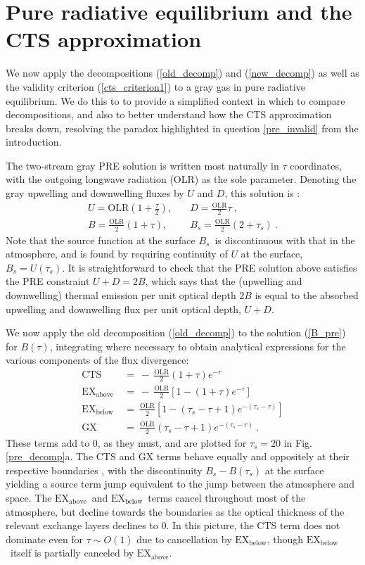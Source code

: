 \documentclass{ametsoc}
\newcommand{\beqn}{\begin{equation}}
\newcommand{\eeqn}{\end{equation}}
\newcommand{\n}{\nonumber}
\newcommand{\eqnref}[1]{(\ref{#1})}
\newcommand{\OLR}{\ensuremath{\mathrm{OLR}}}
\newcommand{\taus}{\ensuremath{\tau_s}}
\newcommand{\Bs}{\ensuremath{B_s}}
\newcommand{\GX}{\ensuremath{\mathrm{GX}}}
\newcommand{\CTS}{\ensuremath{\mathrm{CTS}}}
\newcommand{\EXbelow}{\ensuremath{\mathrm{EX_{below}}}}
\newcommand{\EXabove}{\ensuremath{\mathrm{EX_{above}}}}
\begin{document}
\section{Pure radiative equilibrium and the CTS approximation} \label{sec_pre}
We now apply the decompositions \eqnref{old_decomp} and \eqnref{new_decomp} as well as the validity criterion \eqnref{cts_criterion1} to a gray gas in pure radiative equilibrium.  We do this to to provide a simplified context in which to compare decompositions, and also to better understand how the CTS approximation breaks down, resolving the paradox highlighted in question \ref{pre_invalid} from the introduction.

The two-stream gray PRE solution is written most naturally in $\tau$ coordinates, with the outgoing longwave radiation (OLR) as the sole parameter.  Denoting the gray upwelling and downwelling fluxes by $U$ and  $D$, this solution is \citep[][]{pierrehumbert2010}:
	\begin{align}
		U  =  \OLR\left(1+\frac{\tau}{2}\right), & \quad D =  \frac{\OLR}{2}\tau\ , \n \\
		B  =  \frac{\OLR}{2}\left(1+\tau \right) , &\quad  \Bs= \frac{\OLR}{2}\left(2+\taus\right) \ . \label{B_pre}
	\end{align}
Note that the source function at the surface \Bs\ is discontinuous with that in the atmosphere, and is found by requiring continuity of $U$ at the surface, $\Bs = U(\taus)$. It is straightforward to check that the PRE solution above  satisfies the PRE constraint $U+D=2B$, which says that the (upwelling  and downwelling) thermal emission per unit optical depth $2B$ is equal to the absorbed upwelling and downwelling flux per unit optical depth, $U+D$. 

We now apply the old decomposition \eqnref{old_decomp} to the solution \eqnref{B_pre}  for $B(\tau)$, integrating where necessary to obtain analytical expressions for the various components of the flux divergence:
\beqn
	\begin{split}
		\CTS &\ = \ -\ \frac{\OLR}{2}(1+\tau)e^{-\tau} \\
		\EXabove   &\ =\ - \ \frac{\OLR}{2}\left[1- (1+\tau)e^{-\tau} \right] \\  
		\EXbelow  &\ =\ \frac{\OLR}{2}\left[1-(\taus-\tau+1)e^{-(\taus-\tau)} \right] \\
		\GX   &\ =\ \frac{\OLR}{2}(\taus-\tau+1)e^{-(\taus-\tau)}  \ .
	\end{split}
	\label{pre_old_decomp}
\eeqn
These terms add to 0, as they must, and are plotted for $\taus=20$ in Fig. \ref{pre_decomp}a. The CTS and GX terms behave  equally and oppositely at their respective boundaries , with the discontinuity $\Bs-B(\taus)$ at the surface  yielding a source term jump equivalent to the jump between the atmosphere and space. The \EXabove\ and \EXbelow\ terms cancel throughout most of the atmosphere, but decline towards the boundaries as the optical thickness of the relevant exchange layers declines to 0. In this picture, the CTS term does not dominate even  for $\tau \sim O(1)$ due to cancellation by \EXbelow,  though \EXbelow\ itself is partially canceled by \EXabove.
\end{document}
